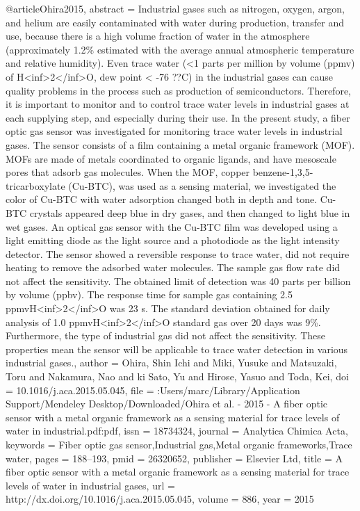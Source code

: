 @article{Ohira2015,
abstract = {Industrial gases such as nitrogen, oxygen, argon, and helium are easily contaminated with water during production, transfer and use, because there is a high volume fraction of water in the atmosphere (approximately 1.2{\%} estimated with the average annual atmospheric temperature and relative humidity). Even trace water ({\textless}1 parts per million by volume (ppmv) of H{\textless}inf{\textgreater}2{\textless}/inf{\textgreater}O, dew point {\textless} -76 ??C) in the industrial gases can cause quality problems in the process such as production of semiconductors. Therefore, it is important to monitor and to control trace water levels in industrial gases at each supplying step, and especially during their use. In the present study, a fiber optic gas sensor was investigated for monitoring trace water levels in industrial gases. The sensor consists of a film containing a metal organic framework (MOF). MOFs are made of metals coordinated to organic ligands, and have mesoscale pores that adsorb gas molecules. When the MOF, copper benzene-1,3,5-tricarboxylate (Cu-BTC), was used as a sensing material, we investigated the color of Cu-BTC with water adsorption changed both in depth and tone. Cu-BTC crystals appeared deep blue in dry gases, and then changed to light blue in wet gases. An optical gas sensor with the Cu-BTC film was developed using a light emitting diode as the light source and a photodiode as the light intensity detector. The sensor showed a reversible response to trace water, did not require heating to remove the adsorbed water molecules. The sample gas flow rate did not affect the sensitivity. The obtained limit of detection was 40 parts per billion by volume (ppbv). The response time for sample gas containing 2.5 ppmvH{\textless}inf{\textgreater}2{\textless}/inf{\textgreater}O was 23 s. The standard deviation obtained for daily analysis of 1.0 ppmvH{\textless}inf{\textgreater}2{\textless}/inf{\textgreater}O standard gas over 20 days was 9{\%}. Furthermore, the type of industrial gas did not affect the sensitivity. These properties mean the sensor will be applicable to trace water detection in various industrial gases.},
author = {Ohira, Shin Ichi and Miki, Yusuke and Matsuzaki, Toru and Nakamura, Nao and ki Sato, Yu and Hirose, Yasuo and Toda, Kei},
doi = {10.1016/j.aca.2015.05.045},
file = {:Users/marc/Library/Application Support/Mendeley Desktop/Downloaded/Ohira et al. - 2015 - A fiber optic sensor with a metal organic framework as a sensing material for trace levels of water in industrial.pdf:pdf},
issn = {18734324},
journal = {Analytica Chimica Acta},
keywords = {Fiber optic gas sensor,Industrial gas,Metal organic frameworks,Trace water},
pages = {188--193},
pmid = {26320652},
publisher = {Elsevier Ltd},
title = {{A fiber optic sensor with a metal organic framework as a sensing material for trace levels of water in industrial gases}},
url = {http://dx.doi.org/10.1016/j.aca.2015.05.045},
volume = {886},
year = {2015}
}
